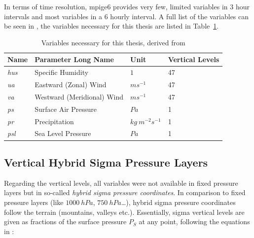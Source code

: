 In terms of time resolution, \ac{mpige6} provides very few, limited variables in 3 hour intervals and most variables in a 6 hourly interval.  
A full list of the variables can be seen in \cite[Table 3]{olonscheck_new_2023}, the variables necessary for this thesis are listed in Table~\ref{tab:thesisVariables}. 

\begin{table}[bht]
\centering
\caption{Variables necessary for this thesis, derived from \cite{olonscheck_new_2023}}
\begin{tabular}{l|l|l|l}
  \label{tab:thesisVariables}
\textbf{Name} & \textbf{Parameter Long Name} & \textbf{Unit}                & \multicolumn{1}{l}{\textbf{Vertical Levels}}  \\ 
\hline
\textit{hus}              & Specific Humidity            & $1$                        & 47                                            \\
\textit{ua}               & Eastward (Zonal) Wind        & $ms^{-1}$              & 47                                            \\
\textit{va}               & Westward (Meridional) Wind   & $ms^{-1}$              & 47                                            \\
\textit{ps}               & Surface Air Pressure         & $Pa$                           & 1                                             \\
\textit{pr}               & Precipitation                & $kg~m^{-2} s^{-1}$ & 1    \\                                        
\textit{psl}               & Sea Level Pressure                & $Pa$ & 1            \\                                
\end{tabular}
\end{table}


\subsection{Vertical Hybrid Sigma Pressure Layers}
\label{sec:hybridsigma}

Regarding the vertical levels, all variables were not available in fixed pressure layers but in so-called \textit{hybrid sigma pressure coordinates}. 
In comparison to fixed pressure layers (like $1000 ~hPa$, $750 ~hPa$\dots), hybrid sigma pressure coordinates follow the terrain (mountains, valleys etc.). 
Essentially, sigma vertical levels are given as fractions of the surface pressure $P_S$ at any point, following the equations in \cite{eckermann_hybrid_2009}: 


